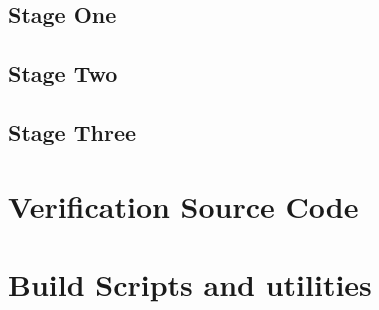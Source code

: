         \subsection{Stage One}
        
        
        
        
        
        
        
        \subsection{Stage Two}
        
        
        
        
        
        
        
        
        
        
        \subsection{Stage Three}
        
        
        
        
        

    \section{Verification Source Code}
        
        
        
        
    
    \section{Build Scripts and utilities}
        
        
        

